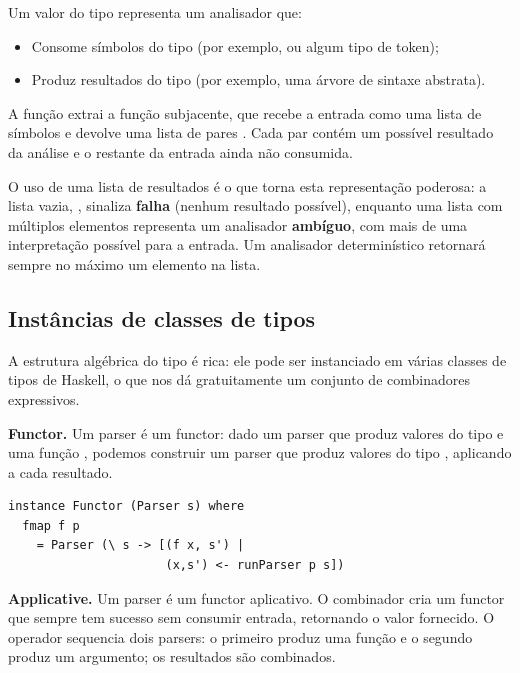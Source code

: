 Um valor do tipo  representa um
analisador que:
\begin{itemize}
  \item Consome símbolos do tipo  (por exemplo,
     ou algum tipo de token);
  \item Produz resultados do tipo  (por exemplo, uma
    árvore de sintaxe abstrata).
\end{itemize}

A função  extrai a função
subjacente, que recebe a entrada como uma lista de símbolos
\haskell{[s]} e devolve uma lista de pares
\haskell{[(a, [s])]}. Cada par contém um possível
resultado da análise e o restante da entrada ainda não consumida.

O uso de uma lista de resultados é o que torna esta representação
poderosa: a lista vazia, \haskell{[]}, sinaliza
\textbf{falha} (nenhum resultado possível), enquanto uma lista com
múltiplos elementos representa um analisador \textbf{ambíguo}, com
mais de uma interpretação possível para a entrada. Um analisador
determinístico retornará sempre no máximo um elemento na lista.

\subsection{Instâncias de classes de tipos}

A estrutura algébrica do tipo  é
rica: ele pode ser instanciado em várias classes de tipos de Haskell,
o que nos dá gratuitamente um conjunto de combinadores expressivos.

\textbf{Functor.} Um parser é um functor: dado um parser que produz
valores do tipo  e uma função
, podemos construir um parser
que produz valores do tipo , aplicando
 a cada resultado.

\begin{verbatim}
instance Functor (Parser s) where
  fmap f p
    = Parser (\ s -> [(f x, s') |
                      (x,s') <- runParser p s])
\end{verbatim}

\textbf{Applicative.} Um parser é um functor aplicativo. O combinador
 cria um functor que sempre tem sucesso
sem consumir entrada, retornando o valor fornecido. O operador
\haskell{<*>} sequencia dois parsers: o primeiro
produz uma função e o segundo produz um argumento; os resultados são combinados.

